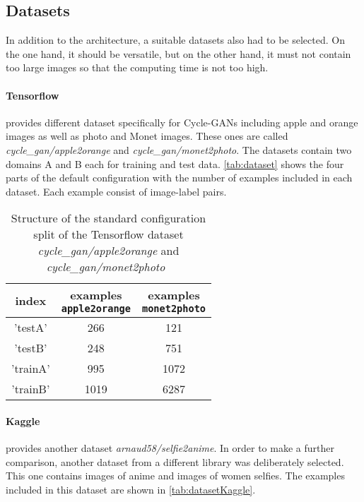 \documentclass[fleqn,10pt]{SelfArx} %
\begin{document}
\subsection{Datasets}
In addition to the architecture, a suitable datasets also had to be selected. On the one hand, it should be versatile, but on the other hand, it must not contain too large images so that the computing time is not too high. 

\paragraph{Tensorflow} provides different dataset specifically for Cycle-\ac{GAN}s including apple and orange images as well as photo and Monet images. These ones are called \textit{cycle\_gan/apple2orange} and \textit{cycle\_gan/monet2photo}. The datasets contain two domains A and B each for training and test data. \autoref{tab:dataset} shows the four parts of the default configuration with the number of examples included in each dataset. Each example consist of image-label pairs.~\cite{google-tf-datasets}

\begin{table}[htb]
\centering
\caption{Structure of the standard configuration split of the Tensorflow dataset \textit{cycle\_gan/apple2orange} and \textit{cycle\_gan/monet2photo}~\cite{google-tf-datasets}}
\label{tab:datasetTF}
\begin{tabular}{c c c}
\textbf{index} & \makecell[cc]{\textbf{examples} \\ \textbf{\texttt{apple2orange}}} & \makecell[cc]{\textbf{examples} \\ \textbf{\texttt{monet2photo}}}\\ \hline
'testA' & 266 & 121 \\ \hline
'testB' & 248 & 751 \\ \hline
'trainA' & 995 & 1072 \\ \hline
'trainB' & 1019 & 6287 \\ \hline
\end{tabular}
\end{table}

\paragraph{Kaggle} provides another dataset \textit{arnaud58/selfie2anime}. In order to make a further comparison, another dataset from a different library was deliberately selected. This one contains images of anime and images of women selfies. The examples included in this dataset are shown in \autoref{tab:datasetKaggle}. \cite{kaggle-dataset}
\end{document}
